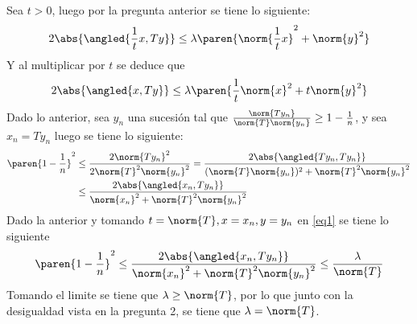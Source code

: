 \documentclass{homework}
\begin{document}
\begin{sol}
    Sea \(t>0\), luego por la pregunta anterior se tiene lo siguiente:
    \begin{equation*}
        2\abs{\angled{\frac1tx,Ty}}\leq\lambda\paren{\norm{\frac1tx}^2+\norm{y}^2}
    \end{equation*}
    Y al multiplicar por \(t\) se deduce que
    \begin{equation}
        2\abs{\angled{x,Ty}}\leq\lambda\paren{\frac1t\norm{x}^2+t\norm{y}^2}\label{eq1}
    \end{equation}
    Dado lo anterior, sea \(y_n\) una sucesión tal que \(\frac{\norm{Ty_n}}{\norm{T}\norm{y_n}}\geq1-\frac1n\), y sea \(x_n=Ty_n\) luego se tiene lo siguiente:
    \begin{align*}
        \paren{1-\frac1n}^2&\leq\frac{2\norm{Ty_n}^2}{2\norm{T}^2\norm{y_n}^2}=\frac{2\abs{\angled{Ty_n,Ty_n}}}{(\norm{T}\norm{y_n})^2+\norm{T}^2\norm{y_n}^2}\\
        &\leq\frac{2\abs{\angled{x_n,Ty_n}}}{\norm{x_n}^2+\norm{T}^2\norm{y_n}^2}
    \end{align*}
    Dado la anterior y tomando \(t=\norm{T},x=x_n,y=y_n\) en \eqref{eq1} se tiene lo siguiente
    \begin{equation*}
        \paren{1-\frac1n}^2\leq\frac{2\abs{\angled{x_n,Ty_n}}}{\norm{x_n}^2+\norm{T}^2\norm{y_n}^2}\leq\frac\lambda{\norm{T}}
    \end{equation*}
    Tomando el limite se tiene que \(\lambda\geq\norm{T}\), por lo que junto con la desigualdad vista en la pregunta 2, se tiene que \(\lambda=\norm{T}\).
\end{sol}
\end{document}
